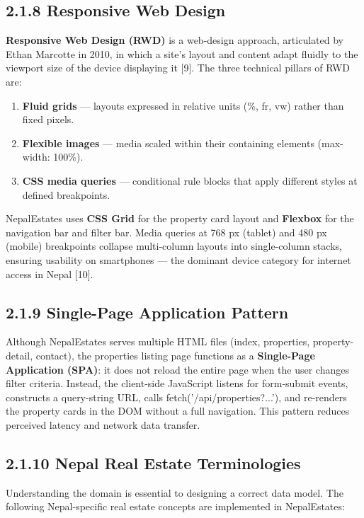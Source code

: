 \documentclass[12pt,a4paper]{report}
\begin{document}
\subsection{2.1.8 Responsive Web Design}
\textbf{Responsive Web Design (RWD)} is a web-design approach, articulated by Ethan Marcotte in 2010, in which a site's layout and content adapt fluidly to the viewport size of the device displaying it [9]. The three technical pillars of RWD are:

\begin{enumerate}
  \item \textbf{Fluid grids} --- layouts expressed in relative units (\%, fr, vw) rather than fixed pixels.
  \item \textbf{Flexible images} --- media scaled within their containing elements (max-width: 100\%).
  \item \textbf{CSS media queries} --- conditional rule blocks that apply different styles at defined breakpoints.
\end{enumerate}
NepalEstates uses \textbf{CSS Grid} for the property card layout and \textbf{Flexbox} for the navigation bar and filter bar. Media queries at 768 px (tablet) and 480 px (mobile) breakpoints collapse multi-column layouts into single-column stacks, ensuring usability on smartphones --- the dominant device category for internet access in Nepal [10].

\subsection{2.1.9 Single-Page Application Pattern}
Although NepalEstates serves multiple HTML files (index, properties, property-detail, contact), the properties listing page functions as a \textbf{Single-Page Application (SPA)}: it does not reload the entire page when the user changes filter criteria. Instead, the client-side JavaScript listens for form-submit events, constructs a query-string URL, calls fetch('/api/properties?...'), and re-renders the property cards in the DOM without a full navigation. This pattern reduces perceived latency and network data transfer.

\subsection{2.1.10 Nepal Real Estate Terminologies}
Understanding the domain is essential to designing a correct data model. The following Nepal-specific real estate concepts are implemented in NepalEstates:
\end{document}
